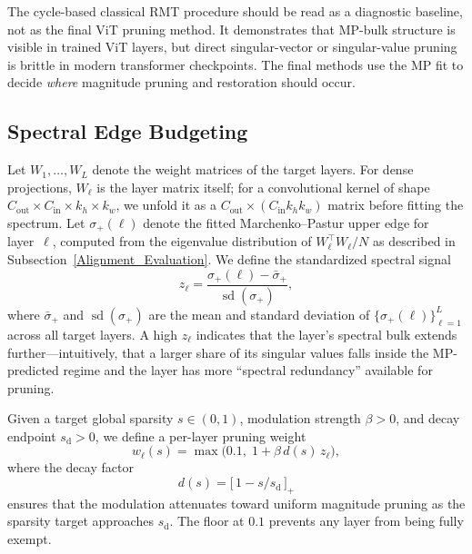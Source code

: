 \documentclass[11pt]{article}
\theoremstyle{plain}
\theoremstyle{definition}
\theoremstyle{remark}
\newcommand{\1}{\mathbf{1}}
\begin{document}
The cycle-based classical RMT procedure should be read as a diagnostic baseline, not as the final ViT pruning method.  It demonstrates that MP-bulk structure is visible in trained ViT layers, but direct singular-vector or singular-value pruning is brittle in modern transformer checkpoints.  The final methods use the MP fit to decide \emph{where} magnitude pruning and restoration should occur.

\subsection{Spectral Edge Budgeting}
\label{subsec:splus_method}

Let \(W_1,\dots,W_L\) denote the weight matrices of the target layers.  For dense projections, \(W_\ell\) is the layer matrix itself; for a convolutional kernel of shape \(C_{\mathrm{out}}\times C_{\mathrm{in}}\times k_h\times k_w\), we unfold it as a \(C_{\mathrm{out}}\times(C_{\mathrm{in}}k_hk_w)\) matrix before fitting the spectrum.  Let \(\sigma_+(\ell)\) denote the fitted Marchenko--Pastur upper edge for layer~\(\ell\), computed from the eigenvalue distribution of \(W_\ell^\top W_\ell / N\) as described in Subsection~\ref{Alignment_Evaluation}.  We define the standardized spectral signal
\[
z_\ell = \frac{\sigma_+(\ell) - \bar{\sigma}_+}{\operatorname{sd}(\sigma_+)},
\]
where \(\bar{\sigma}_+\) and \(\operatorname{sd}(\sigma_+)\) are the mean and standard deviation of \(\{\sigma_+(\ell)\}_{\ell=1}^L\) across all target layers.  A high \(z_\ell\) indicates that the layer's spectral bulk extends further---intuitively, that a larger share of its singular values falls inside the MP-predicted regime and the layer has more ``spectral redundancy'' available for pruning.

Given a target global sparsity \(s\in(0,1)\), modulation strength \(\beta>0\), and decay endpoint \(s_{\mathrm{d}}>0\), we define a per-layer pruning weight
\begin{equation}
\label{eq:splus_weight}
w_\ell(s) = \max\!\Big(0.1,\; 1 + \beta\,d(s)\,z_\ell\Big),
\end{equation}
where the decay factor
\begin{equation}
\label{eq:decay}
d(s) = \bigl[\,1 - s/s_{\mathrm{d}}\,\bigr]_+
\end{equation}
ensures that the modulation attenuates toward uniform magnitude pruning as the sparsity target approaches \(s_{\mathrm{d}}\).  The floor at \(0.1\) prevents any layer from being fully exempt.
\end{document}
